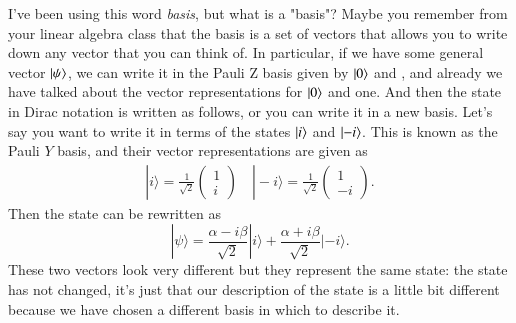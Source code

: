 I've been using this word \emph{basis}, but what is a "basis"? Maybe you remember from your linear algebra class that the basis is a set of vectors that allows you to write down any vector that you can think of. In particular, if we have some general vector $\left| \psi \right\rangle$, we can write it in the Pauli Z basis given by $\left| 0 \right\rangle$ and , and already we have talked about the vector representations for $\left| 0 \right\rangle$ and one. And then the state in Dirac notation is written as follows, or you can write it in a new basis. Let's say you want to write it in terms of the states $\left| i \right\rangle$ and $\left| -i \right\rangle$. This is known as the Pauli $Y$ basis, and their vector representations are given as
\begin{align}
    |i\rangle=\frac{1}{\sqrt{2}}\left(\begin{array}{l}1 \\ i\end{array}\right) \quad|-i\rangle=\frac{1}{\sqrt{2}}\left(\begin{array}{c}1 \\ -i\end{array}\right).
\end{align}
Then the state can be rewritten as
\begin{equation}
|\psi\rangle=\frac{\alpha-i \beta}{\sqrt{2}}|i\rangle+\frac{\alpha+i \beta}{\sqrt{2}}|-i\rangle.
\end{equation}
These two vectors look very different but they represent the same state: the state has not changed, it's just that our description of the state is a little bit different because we have chosen a different basis in which to describe it.

